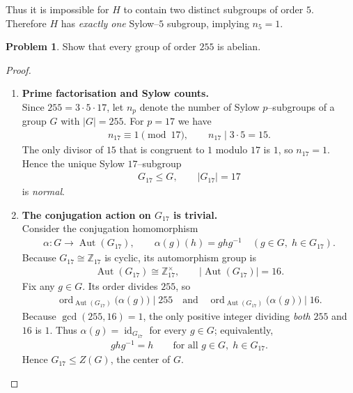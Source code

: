 \documentclass[12pt]{article}
\theoremstyle{definition} %
\newtheorem{problem}{Problem}
\theoremstyle{plain} %
\begin{document}
Thus it is impossible for $H$ to contain two distinct subgroups of
order $5$.  Therefore \(H\) has \emph{exactly one} Sylow–$5$ subgroup,
implying \(n_5 = 1\).

\begin{problem}
  Show that every group of order $255$ is abelian.
\end{problem}

\begin{proof}
  \begin{enumerate}
      \item \textbf{Prime factorisation and Sylow counts.}\\
            Since $255 = 3\cdot 5\cdot 17$, let $n_{p}$ denote the number of Sylow $p$–subgroups of a group $G$ with $\lvert G\rvert =255$.
            For $p = 17$ we have
            \begin{align}
                n_{17} \equiv 1 \pmod{17},
                \qquad
                n_{17} \mid 3\cdot 5 = 15 .
            \end{align}
            The only divisor of $15$ that is congruent to $1$ modulo $17$ is $1$, so $n_{17}=1$.
            Hence the unique Sylow $17$–subgroup
            \begin{align}
                G_{17}\le G,\qquad \lvert G_{17}\rvert = 17
            \end{align}
            is \emph{normal}.

      \item \textbf{The conjugation action on $G_{17}$ is trivial.}\\
            Consider the conjugation homomorphism
            \begin{align}
                \alpha\colon G \longrightarrow \operatorname{Aut}(G_{17}),
                \qquad
                \alpha(g)(h) = ghg^{-1}\quad (g\in G,\;h\in G_{17}).
            \end{align}
            Because $G_{17}\cong \mathbb{Z}_{17}$ is cyclic, its automorphism group is
            \begin{align}
                \operatorname{Aut}(G_{17})\cong \mathbb{Z}_{17}^{\times},
                \qquad
                \lvert \operatorname{Aut}(G_{17}) \rvert = 16 .
            \end{align}
            Fix any $g\in G$.  Its order divides $255$, so
            \begin{align}
                \operatorname{ord}_{\operatorname{Aut}(G_{17})}\!\bigl(\alpha(g)\bigr)
                \mid 255
                \quad\text{and}\quad
                \operatorname{ord}_{\operatorname{Aut}(G_{17})}\!\bigl(\alpha(g)\bigr)
                \mid 16 .
            \end{align}
            Because $\gcd(255,16)=1$, the only positive integer dividing \emph{both} $255$ and $16$ is $1$.
            Thus $\alpha(g)=\operatorname{id}_{G_{17}}$ for every $g\in G$; equivalently,
            \begin{align}
                ghg^{-1}=h \qquad\text{for all } g\in G,\;h\in G_{17}.
            \end{align}
            Hence $G_{17}\le Z(G)$, the center of $G$.


\end{enumerate}
\end{proof}
\end{document}
